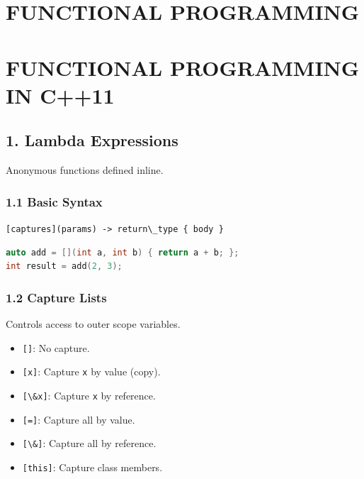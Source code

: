 \hypertarget{functional-programming}{%
\chapter{FUNCTIONAL PROGRAMMING}\label{functional-programming}}

\hypertarget{functional-programming-in-c11}{%
\chapter{FUNCTIONAL PROGRAMMING IN
C++11}\label{functional-programming-in-c11}}

\hypertarget{lambda-expressions}{%
\section{1. Lambda Expressions}\label{lambda-expressions}}

Anonymous functions defined inline.

\hypertarget{basic-syntax}{%
\subsection{1.1 Basic Syntax}\label{basic-syntax}}

\passthrough{\lstinline![captures](params) -> return\_type \{ body \}!}

\begin{lstlisting}[language={C++}]
auto add = [](int a, int b) { return a + b; };
int result = add(2, 3);
\end{lstlisting}

\hypertarget{capture-lists}{%
\subsection{1.2 Capture Lists}\label{capture-lists}}

Controls access to outer scope variables.

\begin{itemize}
\tightlist
\item
  \passthrough{\lstinline![]!}: No capture.
\item
  \passthrough{\lstinline![x]!}: Capture \passthrough{\lstinline!x!} by
  value (copy).
\item
  \passthrough{\lstinline![\&x]!}: Capture \passthrough{\lstinline!x!}
  by reference.
\item
  \passthrough{\lstinline![=]!}: Capture all by value.
\item
  \passthrough{\lstinline![\&]!}: Capture all by reference.
\item
  \passthrough{\lstinline![this]!}: Capture class members.
\end{itemize}

